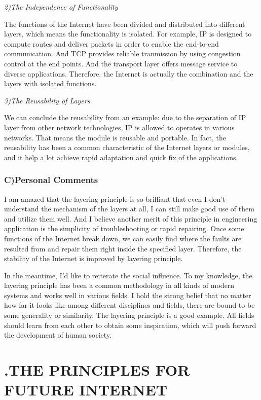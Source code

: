 \documentclass[11pt,twocolumn]{article}
\begin{document}
\emph{2)\quad The Independence of Functionality}

The functions of the Internet have been divided and distributed into different layers, which means the functionality is isolated. For example, IP is designed to compute routes and deliver packets in order to enable the end-to-end communication. And TCP provides reliable tranmission by using congestion control at the end points. And the transport layer offers message service to diverse applications. Therefore, the Internet is actually the combination and the layers with isolated functions.

\emph{3)\quad The Reusability of Layers}

We can conclude the reusability from an example: due to the separation of IP layer from other network technologies, IP is allowed to operates in various networks. That means the module is reusable and portable. In fact, the reusability has been a common characteristic of the Internet layers or modules, and it help a lot achieve rapid adaptation and quick fix of the applications. 

\subsubsection*{C)\quad Personal Comments}

I am amazed that the layering principle is so brilliant that even I don't understand the mechanism of the layers at all, I can still make good use of them and utilize them well. And I believe another merit of this principle in engineering application is the simplicity of troubleshooting or rapid repairing. Once some functions of the Internet break down, we can easily find where the faults are resulted from and repair them right inside the specified layer. Therefore, the stability of the Internet is improved by layering principle. 

In the meantime, I'd like to reiterate the social influence. To my knowledge, the layering principle has been a common methodology in all kinds of modern systems and works well in various fields. I hold the strong belief that no matter how far it looks like among different disciplines and fields, there are bound to be some generality or similarity. The layering principle is a good example. All fields should learn from each other to obtain some inspiration, which will push forward the development of human society.

\section*{\textbf{\uppercase\expandafter{}.\quad THE PRINCIPLES FOR FUTURE INTERNET}}
\end{document}
